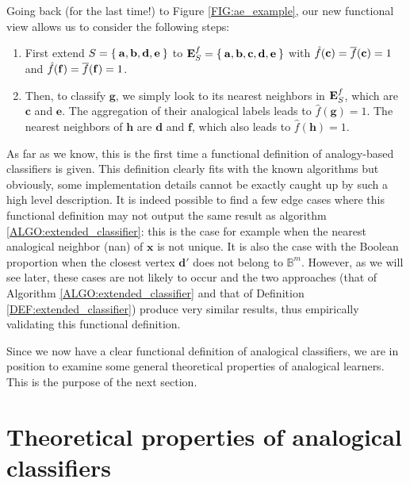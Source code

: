 \begin{testexample}
Going back (for the last time!) to Figure \ref{FIG:ae_example}, our
new functional view allows us to consider the following steps:
\begin{enumerate}
  \item First extend $S = \Set{\mathbf{a}, \mathbf{b}, \mathbf{d}, \mathbf{e}}$
    to $\mathbf{E}_{S}^{f} = \Set{\mathbf{a}, \mathbf{b}, \mathbf{c}, \mathbf{d},
    \mathbf{e}}$ with $\hat{f}(\mathbf{c}) = \overline{f}(\mathbf{c}) = 1$ and
    $\hat{f}(\mathbf{f}) = \overline{f}(\mathbf{f}) = 1$.
  \item Then, to classify $\mathbf{g}$, we simply look to its nearest neighbors
    in $\mathbf{E}_{S}^{f}$, which are $\mathbf{c}$ and $\mathbf{e}$. The aggregation of
    their analogical labels leads to
    $\hat{f}(\mathbf{g}) = 1$. The nearest neighbors of $\mathbf{h}$ are
    $\mathbf{d}$ and $\mathbf{f}$, which also leads to $\hat{f}(\mathbf{h}) =
    1$.
\end{enumerate}
\end{testexample}

As far as we know, this is the first time a functional definition of
analogy-based classifiers is given. This definition clearly fits with the known
algorithms but obviously, some implementation details cannot be exactly caught
up by such a high level description. It is indeed possible to find a few edge
cases where this functional definition may not output the same result as
algorithm \ref{ALGO:extended_classifier}: this is the case for example when the
nearest analogical neighbor (nan) of $\mathbf{x}$ is not unique. It is also the
case with the Boolean proportion when the closest vertex $\mathbf{d}'$ does not
belong to $\mathbb{B}^m$.  However, as we will see later, these cases are not
likely to occur and the two approaches (that of Algorithm
\ref{ALGO:extended_classifier} and that of Definition
\ref{DEF:extended_classifier}) produce very similar results, thus empirically
validating this functional definition.

Since we now have a clear functional definition of analogical classifiers, we
are in position to examine some general theoretical properties of analogical
learners. This is the purpose of the next section.
\section{Theoretical properties of analogical classifiers}
\label{SEC:theoretical_properties_of_analogical_classifiers}

